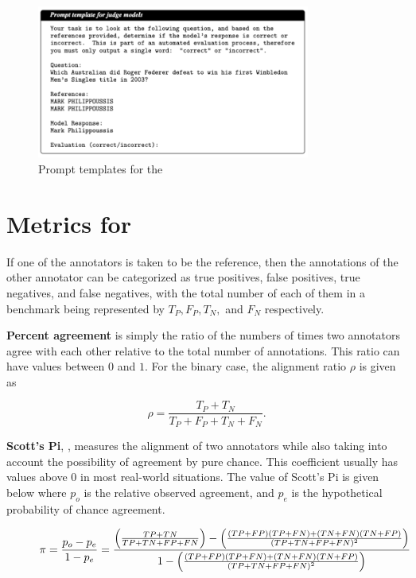 \begin{figure}[h]
    \centering
        \includegraphics[width=0.8\textwidth, ]{figures/JudgePromptTemplate.pdf}
    \caption{Prompt templates for the \judgemodels}
    \label{app:WithoutGuidelines}
\end{figure}

\section{Metrics for \judgemodels}
\label{app:metrics}

If one of the annotators is taken to be the reference, then the annotations of the other annotator can be categorized as true positives, false positives, true negatives, and false negatives, with the total number of each of them in a benchmark being represented by $T_P, F_P, T_N,$ and $F_N$ respectively.

\textbf{Percent agreement} is simply the ratio of the numbers of times two annotators agree with each other relative to the total number of annotations. This ratio can have values between $0$ and $1$. For the binary case, the alignment ratio $\rho$ 
is given as

\begin{equation}
    \rho = \frac{T_P + T_N}{T_P + F_P + T_N + F_N}.
\end{equation}

\textbf{Scott's Pi}, \citep{scott1995scottspi}, measures the alignment of two annotators while also taking into account the possibility of agreement by pure chance. This coefficient usually has values above $0$ in most real-world situations. The value of Scott's Pi is given below where $p_o$ is the relative observed agreement, and $p_e$ is the hypothetical probability of chance agreement. 

\begin{figure}[t]
\begin{equation*}
\pi = \frac{p_o - p_e}{1 - p_e} \nonumber \\
    = \frac{
        \left(\frac{TP + TN}{TP + TN + FP + FN}\right) - 
        \left(\frac{(TP + FP)(TP + FN) + (TN + FN)(TN + FP)}
        {(TP + TN + FP + FN)^2}\right)
    }{
        1 - 
        \left(\frac{(TP + FP)(TP + FN) + (TN + FN)(TN + FP)}
        {(TP + TN + FP + FN)^2}\right)
    }
\end{equation*}
\vspace{-1em}
\label{app:scott-pi}
\end{figure}

